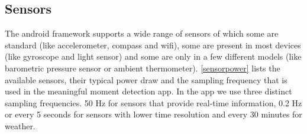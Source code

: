 \documentclass[a4paper]{report}
\begin{document}
\subsection{Sensors}\label{sensors}
The android framework supports a wide range of sensors of which some are standard (like accelerometer, compass and wifi), some are present in most devices (like gyroscope and light sensor) and some are only in a few different models (like barometric pressure sensor or ambient thermometer). \autoref{sensorpower} lists the available sensors, their typical power draw and the sampling frequency that is used in the meaningful moment detection app. In the app we use three distinct sampling frequencies. 50 Hz for sensors that  provide real-time information, 0.2 Hz or every 5 seconds for sensors with lower time resolution and every 30 minutes for weather.
\end{document}
